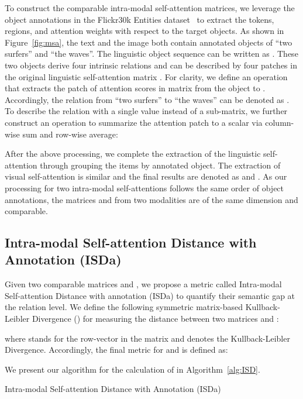 \documentclass[11pt,a4paper]{article}
\begin{document}
To construct the comparable intra-modal self-attention matrices, we leverage the object annotations in the Flickr30k Entities dataset~\cite{Flickr30k-Entities} to extract the tokens, regions, and attention weights with respect to the target objects. 
As shown in Figure~\ref{fig:msa}, the text and the image both contain annotated objects of ``two surfers'' and ``the waves''.
The linguistic object sequence can be written as . 
These two objects derive four intrinsic relations and can be described by four patches in the original linguistic self-attention matrix .
For clarity, we define an operation  that extracts the patch of attention scores in matrix  from the object  to . 
Accordingly, the relation from ``two surfers'' to ``the waves'' can be denoted as . 
To describe the relation with a single value instead of a sub-matrix, we further construct an operation  to summarize the attention patch  to a scalar via column-wise sum and row-wise average:

After the above processing, we complete the extraction of the linguistic self-attention  through grouping the items by annotated object.  
The extraction of visual self-attention  is similar and the final results are denoted as  and .
As our processing for two intra-modal self-attentions follows the same order of object annotations, the matrices  and  from two modalities are of the same dimension and comparable.

\subsection{Intra-modal Self-attention Distance with Annotation (ISDa)}
\label{subsec:ISD}
Given two comparable matrices  and , we propose a metric called Intra-modal Self-attention Distance with annotation (ISDa) to quantify their semantic gap at the relation level. 
We define the following symmetric matrix-based Kullback-Leibler Divergence () for measuring the distance between two matrices  and :

where  stands for the  row-vector in the matrix and  denotes the Kullback-Leibler Divergence. 
Accordingly, the final  metric for  and  is defined as:

We present our algorithm for the calculation of  in Algorithm~\ref{alg:ISD}.
\newcommand\mycommfont[1]{\small\ttfamily{#1}}
\begin{algorithm}[t]
\small
\DontPrintSemicolon
{}
\Return 
\caption{Intra-modal Self-attention Distance with Annotation (ISDa)}
\label{alg:ISD}
\end{algorithm}
\end{document}
